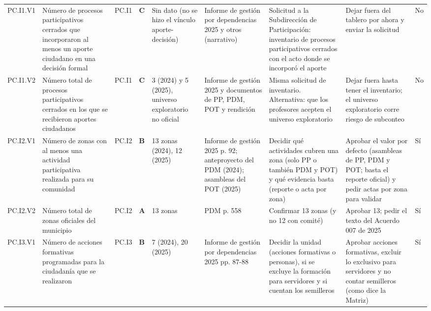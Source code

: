 \documentclass[11pt,letterpaper]{article}
\begin{document}
{\begin{xltabular}{\linewidth}{L{1.94cm}L{2.56cm}L{2.04cm}L{1.12cm}L{2.87cm}L{2.87cm}L{2.71cm}L{2.77cm}L{2.04cm}}
PC.I1.V1 & Número de procesos participativos cerrados que incorporaron al menos un aporte ciudadano en una decisión formal & PC.I1 & \textbf{C} & Sin dato (no se hizo el vínculo aporte-decisión) & Informe de gestión por dependencias 2025 y otros (narrativo) & Solicitud a la Subdirección de Participación: inventario de procesos participativos cerrados con el acto donde se incorporó el aporte & Dejar fuera del tablero por ahora y enviar la solicitud & No \\
PC.I1.V2 & Número total de procesos participativos cerrados en los que se recibieron aportes ciudadanos & PC.I1 & \textbf{C} & 3 (2024) y 5 (2025), universo exploratorio no oficial & Informe de gestión 2025 y documentos de PP, PDM, POT y rendición & Misma solicitud de inventario. Alternativa: que los profesores acepten el universo exploratorio & Dejar fuera hasta tener el inventario; el universo exploratorio corre riesgo de subconteo & No \\
PC.I2.V1 & Número de zonas con al menos una actividad participativa realizada para su comunidad & PC.I2 & \textbf{B} & 13 zonas (2024), 12 (2025) & Informe de gestión 2025 p. 92; anteproyecto del PDM (2024); asambleas del POT (2025) & Decidir qué actividades cubren una zona (solo PP o también PDM y POT) y qué evidencia basta (reporte o acta por zona) & Aprobar el valor por defecto (asambleas de PP, PDM y POT; basta el reporte oficial) y pedir actas por zona para validar & Sí \\
PC.I2.V2 & Número total de zonas oficiales del municipio & PC.I2 & \textbf{A} & 13 zonas & PDM p. 558 & Confirmar 13 zonas (y no 12 con comité) & Aprobar 13; pedir el texto del Acuerdo 007 de 2025 & Sí \\
PC.I3.V1 & Número de acciones formativas programadas para la ciudadanía que se realizaron & PC.I3 & \textbf{B} & 7 (2024), 20 (2025) & Informe de gestión por dependencias 2025 pp. 87-88 & Decidir la unidad (acciones formativas o personas), si se excluye la formación para servidores y si cuentan los semilleros & Aprobar acciones formativas, excluir lo exclusivo para servidores y no contar semilleros (como dice la Matriz) & Sí \\

\end{xltabular}}
\end{document}
